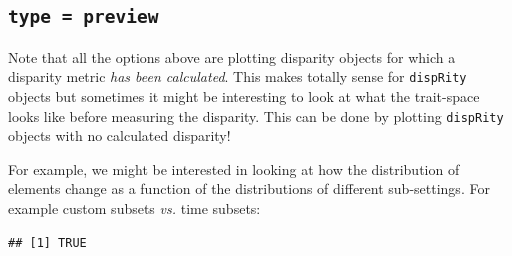 \documentclass[
]{book}
\newenvironment{Shaded}{\begin{snugshade}}{\end{snugshade}}
\newcommand{\CommentTok}[1]{\textcolor[rgb]{0.56,0.35,0.01}{\textit{#1}}}
\newcommand{\DataTypeTok}[1]{\textcolor[rgb]{0.13,0.29,0.53}{#1}}
\newcommand{\DecValTok}[1]{\textcolor[rgb]{0.00,0.00,0.81}{#1}}
\newcommand{\KeywordTok}[1]{\textcolor[rgb]{0.13,0.29,0.53}{\textbf{#1}}}
\newcommand{\NormalTok}[1]{#1}
\newcommand{\OperatorTok}[1]{\textcolor[rgb]{0.81,0.36,0.00}{\textbf{#1}}}
\newcommand{\OtherTok}[1]{\textcolor[rgb]{0.56,0.35,0.01}{#1}}
\newcommand{\StringTok}[1]{\textcolor[rgb]{0.31,0.60,0.02}{#1}}
\begin{document}
\hypertarget{type-preview}{%
\subsection{\texorpdfstring{\texttt{type\ =\ preview}}{type = preview}}\label{type-preview}}

Note that all the options above are plotting disparity objects for which a disparity metric \emph{has been calculated}.
This makes totally sense for \texttt{dispRity} objects but sometimes it might be interesting to look at what the trait-space looks like before measuring the disparity.
This can be done by plotting \texttt{dispRity} objects with no calculated disparity!

For example, we might be interested in looking at how the distribution of elements change as a function of the distributions of different sub-settings.
For example custom subsets \emph{vs.} time subsets:

\begin{Shaded}
\end{Shaded}

\begin{verbatim}
## [1] TRUE
\end{verbatim}

\begin{Shaded}
\end{Shaded}
\end{document}
